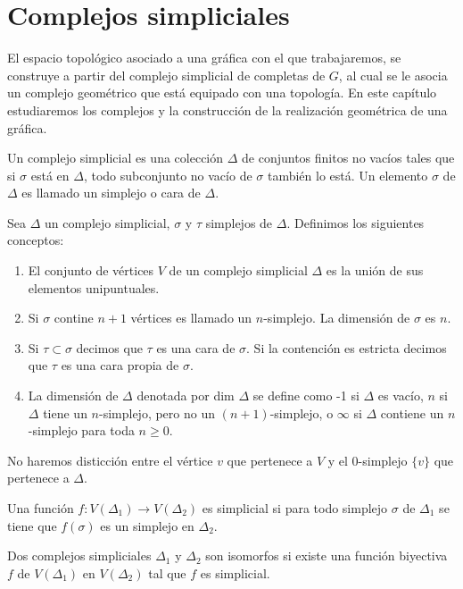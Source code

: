 \chapter{Complejos simpliciales}
El espacio topológico asociado a una gráfica con el que trabajaremos, se construye a partir del complejo simplicial de completas de $G$, al cual se le asocia un complejo geométrico que está equipado con una topología. En este capítulo estudiaremos los complejos y la construcción de la realización geométrica de una gráfica.

\begin{Defi}
Un complejo simplicial es una colección $\Delta$ de conjuntos finitos no vacíos tales que si $\sigma$ está en $\Delta$, todo subconjunto no vacío de $\sigma$ también lo está. Un elemento $\sigma$ de $\Delta$ es llamado un simplejo o cara de $\Delta$. 
\end{Defi}

\begin{Defi}
Sea $\Delta$ un complejo simplicial, $\sigma$ y $\tau$ simplejos de $\Delta$. Definimos los siguientes conceptos:
\begin{enumerate}
\item El conjunto de vértices $V$ de un complejo simplicial $\Delta$ es la unión de sus elementos unipuntuales.
\item Si $\sigma$ contine $n + 1$ vértices es llamado un $n$-simplejo. La dimensión de $\sigma$ es $n$.
\item Si $\tau\subset\sigma$ decimos que $\tau$ es una cara de $\sigma$. Si la contención es estricta decimos que $\tau$ es una cara propia de $\sigma$.
\item La dimensión de $\Delta$ denotada por dim $\Delta$ se define como -1 si $\Delta$ es vacío, $n$ si $\Delta$ tiene un $n$-simplejo, pero no un $(n+1)$-simplejo, o $\infty$ si $\Delta$ contiene un $n$-simplejo para toda $n\geqslant 0$.
\end{enumerate}
\end{Defi}
No haremos disticción entre el vértice $v$ que pertenece a $V$ y el 0-simplejo $\{v\}$ que pertenece a $\Delta$.
\begin{Defi}
Una función $f\colon V(\Delta_1)\rightarrow V(\Delta_2)$ es simplicial si para todo simplejo $\sigma$ de $\Delta_1$ se tiene que $f(\sigma)$ es un simplejo en $\Delta_2$.
\end{Defi}
\begin{Defi}
Dos complejos simpliciales $\Delta_1$ y $\Delta_2$ son isomorfos si existe una función biyectiva $f$ de $V(\Delta_1)$ en $V(\Delta_2)$ tal que $f$ es simplicial.
\end{Defi}

